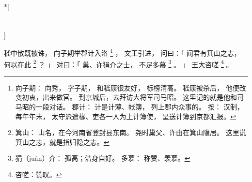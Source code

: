 
\switchcolumn[0]*[\section{}]

嵇中散既被诛，
向子期举郡计入洛%
\footnote{%
    向子期：
        向秀，
        字子期，
        和嵇康很友好，
        标榜清高。
        嵇康被杀后，
        他便改变初衷，出来做官。
        到京城后，去拜访大将军司马昭。
        这里记的就是他和司马昭的一段对话。
    郡计：
        计是计薄、帐簿，
        列上郡内众事的。
        按：
        汉制，每年年末，
        太守派遣椽、吏各一人为上计簿使，
        呈送计簿到京都汇报。
}%
，
文王引进，
问曰：「
    闻君有箕山之志，
    何以在此%
    \footnote{%
        箕山：
            山名，在今河南省登封县东南。
            尧时巢父、许由在箕山隐居。
            这里说箕山之志，就是指归隐之志。
    }%
    ？
」
对曰：「
    巢、许狷介之士，
    不足多慕%
    \footnote{%
        狷（juàn）介：
            孤高；洁身自好。
        多慕：
            称赞、羡慕。
    }%
    。
」
王大咨嗟%
\footnote{%
    咨嗟：赞叹。
}%
。

\switchcolumn



